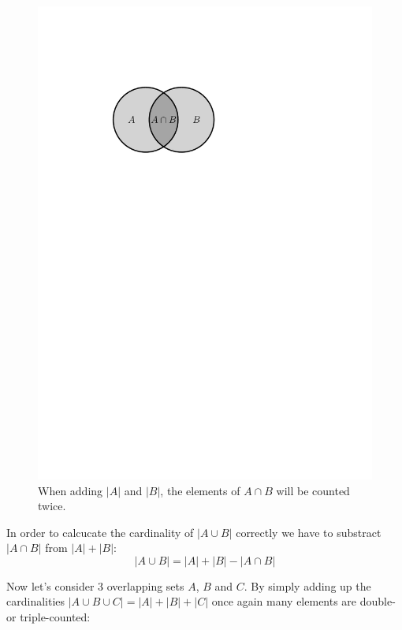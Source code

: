 \begin{figure}[htb]
	\centering
	\includegraphics[scale=.5]{02_higher_combinatorics/pics/a_cut_b.pdf}
	\caption{When adding $|A|$ and $|B|$, the elements of $A \cap B$ will be counted twice.}
\end{figure}                                                                                                                                                                                                                                                        

In order to calcucate the cardinality of $|A \cup B|$ correctly we have to substract
$|A \cap B|$ from $|A| + |B|$:
\[
	|A \cup B| = |A| + |B| - |A \cap B|
\]

Now let's consider 3 overlapping sets $A$, $B$ and $C$. By simply adding up the cardinalities
$|A \cup B \cup C| = |A| + |B| + |C|$ once again many elements are double- or triple-counted:


